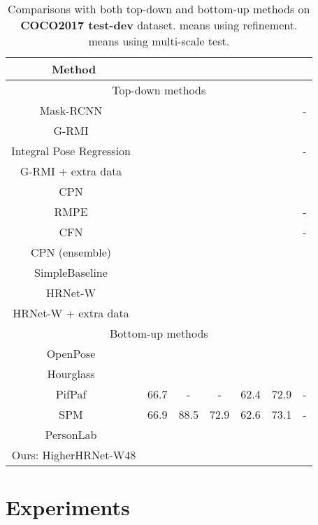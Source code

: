 \documentclass[10pt,twocolumn,letterpaper]{article}
\begin{document}
\begin{table}[t]
    \centering
    \footnotesize
    \setlength{\tabcolsep}{2.0pt}
    \begin{tabular}{c|c|c|c|c|c|c}
    Method &   &  &  &  &  & \\
    \hline
    \multicolumn{7}{c}{Top-down methods}\\
    \hline
    Mask-RCNN~\cite{he2017mask}&  & &&&&-\\
    G-RMI~\cite{papandreou2017towards} & & &&&&\\
    Integral Pose Regression~\cite{sun2018integral}  & & &&&&-\\
    G-RMI + extra data~\cite{papandreou2017towards} & & &&&&\\
    CPN~\cite{chen2018cascaded}  &  & &&&&\\
    RMPE~\cite{fang2017rmpe}  & & &&&&-\\
    CFN~\cite{huang2017coarse}  &  & &&&&-\\
    CPN (ensemble)~\cite{chen2018cascaded}  & & &&&&\\
    SimpleBaseline~\cite{xiao2018simple} & & &&&&\\
    HRNet-W~\cite{sun2019deep,WangSCJDZLMTWLX19} & &&&&&\\
    HRNet-W + extra data~\cite{sun2019deep,WangSCJDZLMTWLX19} & &&&&&\\ \hline
    \multicolumn{7}{c}{Bottom-up methods}\\
    \hline
    OpenPose~\cite{cao2017realtime} & & &&&&\\
    Hourglass~\cite{newwell2017associative}  & & &&&&\\
    PifPaf~\cite{kreiss2019pifpaf} & 66.7 & - & - & 62.4 & 72.9 & - \\
    SPM~\cite{nie2019single} & 66.9 & 88.5 & 72.9 & 62.6 & 73.1 & - \\
    PersonLab~\cite{papandreou2018personlab}  & & &&&&\\
    Ours: HigherHRNet-W48 &&&&&&\\
    \end{tabular}\vspace{2mm}
    \caption{Comparisons with both top-down and bottom-up methods on \textbf{COCO2017 test-dev} dataset.  means using refinement.  means using multi-scale test.} 
    \label{tab:coco_test_dev_all}
    \vspace{-2mm}
\end{table}


\section{Experiments}
\end{document}
